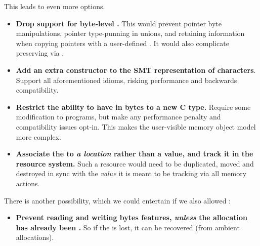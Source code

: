 This leads to even more options.
\begin{itemize}
    \item \textbf{Drop support for byte-level .} This would
        prevent pointer byte manipulations, pointer type-punning in unions,
        and retaining  information when copying pointers with a
        user-defined . It would also complicate preserving
         via .
    \item \textbf{Add an extra constructor to the SMT representation of
        characters}. Support all aforementioned idioms, risking performance and
        backwards compatibility.
    \item \textbf{Restrict the ability to have  in bytes to a new C
        type.} Require some modification to  programs, but make any
        performance penalty and compatibility issues opt-in. This makes the
        user-visible memory object model more complex.
    \item \textbf{Associate the  to \emph{a location} rather
        than a value, and track it in the resource system.} Such a resource
        would need to be duplicated, moved and destroyed in sync with the
        \emph{value} it is meant to be tracking via all memory actions.
\end{itemize}

There is another possibility, which we could entertain if we also allowed
:
\begin{itemize}
    \item \textbf{Prevent reading and writing bytes features, \emph{unless}
        the allocation has already been .} So if the 
         is lost, it can be recovered (from ambient
         allocations).
\end{itemize}

